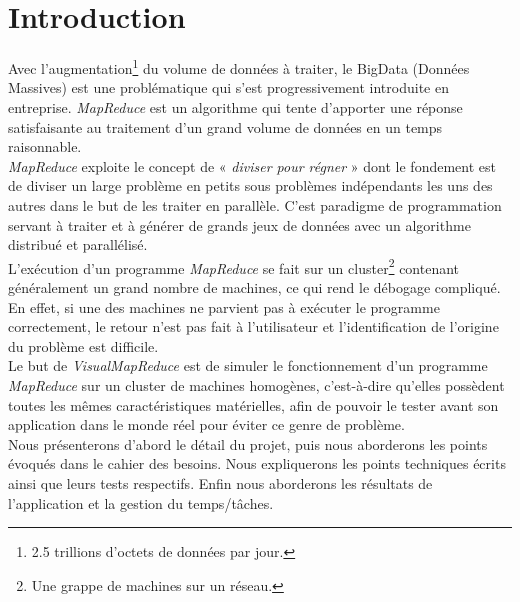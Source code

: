 \chapter*{Introduction}
Avec l'augmentation\footnote{2.5 trillions d'octets de données par jour\cite{mapReduceTextProcessing}.} du volume de données à traiter, le BigData (Données Massives) est une problématique qui s'est progressivement introduite en entreprise\cite{JoliaFerrierBigData}. {\it MapReduce} est un algorithme qui tente d'apporter une réponse satisfaisante au traitement d'un grand volume de données en un temps raisonnable.\\

{\it MapReduce} exploite le concept de « {\it diviser pour régner} » dont le fondement est de diviser un large problème en petits sous problèmes indépendants les uns des autres dans le but de les traiter en parallèle\cite{mapReduceTextProcessing}. C'est paradigme de programmation servant à traiter et à générer de grands jeux de données avec un algorithme distribué et parallélisé.\\

L'exécution d'un programme {\it MapReduce} se fait sur un cluster\footnote{Une grappe de machines sur un réseau.} contenant généralement un grand nombre de machines, ce qui rend le débogage compliqué. En effet, si une des machines ne parvient pas à exécuter le programme correctement, le retour n'est pas fait à l'utilisateur et l'identification de l'origine du problème est difficile.\\

Le but de {\it VisualMapReduce} est de simuler le fonctionnement d'un programme {\it MapReduce} sur un cluster de machines homogènes, c'est-à-dire qu'elles possèdent toutes les mêmes caractéristiques matérielles, afin de pouvoir le tester avant son application dans le monde réel pour éviter ce genre de problème.\\


Nous présenterons d'abord le détail du projet, puis nous aborderons les points évoqués dans le cahier des besoins. Nous expliquerons les points techniques écrits ainsi que leurs tests respectifs. Enfin nous aborderons les résultats de l'application et la gestion du temps/tâches.
